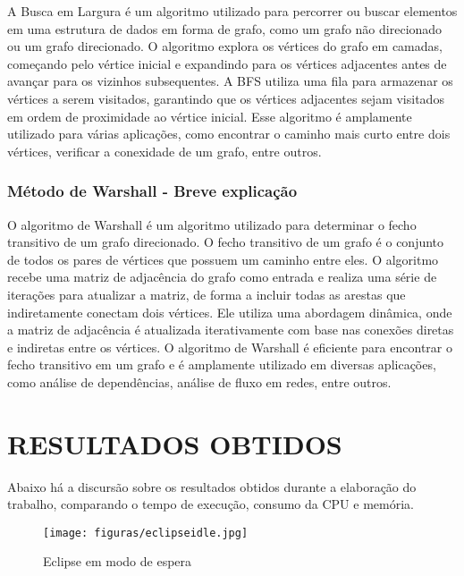 A Busca em Largura é um algoritmo utilizado para percorrer ou buscar elementos em uma estrutura de dados em forma de grafo, como um grafo não direcionado ou um grafo direcionado. O algoritmo explora os vértices do grafo em camadas, começando pelo vértice inicial e expandindo para os vértices adjacentes antes de avançar para os vizinhos subsequentes. A BFS utiliza uma fila para armazenar os vértices a serem visitados, garantindo que os vértices adjacentes sejam visitados em ordem de proximidade ao vértice inicial. Esse algoritmo é amplamente utilizado para várias aplicações, como encontrar o caminho mais curto entre dois vértices, verificar a conexidade de um grafo, entre outros.

\subsubsection{\esp Método de Warshall - Breve explicação}

O algoritmo de Warshall é um algoritmo utilizado para determinar o fecho transitivo de um grafo direcionado. O fecho transitivo de um grafo é o conjunto de todos os pares de vértices que possuem um caminho entre eles. O algoritmo recebe uma matriz de adjacência do grafo como entrada e realiza uma série de iterações para atualizar a matriz, de forma a incluir todas as arestas que indiretamente conectam dois vértices. Ele utiliza uma abordagem dinâmica, onde a matriz de adjacência é atualizada iterativamente com base nas conexões diretas e indiretas entre os vértices. O algoritmo de Warshall é eficiente para encontrar o fecho transitivo em um grafo e é amplamente utilizado em diversas aplicações, como análise de dependências, análise de fluxo em redes, entre outros.

\section{\esp RESULTADOS OBTIDOS}

Abaixo há a discursão sobre os resultados obtidos durante a elaboração do trabalho, comparando o tempo de execução, consumo da CPU e memória.

\vspace{\baselineskip}

\begin{figure}[ht]
	\centering	
	\caption[\hspace{0.1cm}Eclipse Idle]{Eclipse em modo de espera}
	\vspace{-0.4cm}
	\texttt{[image: figuras/eclipseidle.jpg]}
	 \vspace{-0.2cm}
\end{figure}
\vspace{-0.5cm}

